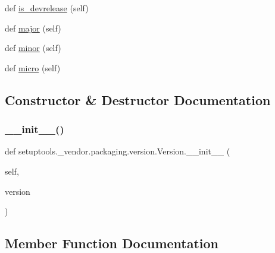 \begin{DoxyCompactItemize}
\item 
def \hyperlink{classsetuptools_1_1__vendor_1_1packaging_1_1version_1_1Version_a8b32bc8a3e8637e0c89748dbf16e2fe0}{is\+\_\+devrelease} (self)
\item 
def \hyperlink{classsetuptools_1_1__vendor_1_1packaging_1_1version_1_1Version_a790c4444a07565075020e9f3683d464d}{major} (self)
\item 
def \hyperlink{classsetuptools_1_1__vendor_1_1packaging_1_1version_1_1Version_a921ad0cf92cd8d0a63b75ae45d0c5cd7}{minor} (self)
\item 
def \hyperlink{classsetuptools_1_1__vendor_1_1packaging_1_1version_1_1Version_abce3f33f0ed231c5909acb2e64160e44}{micro} (self)
\end{DoxyCompactItemize}


\subsection{Constructor \& Destructor Documentation}
\mbox{\label{classsetuptools_1_1__vendor_1_1packaging_1_1version_1_1Version_ae8b2f8a830a6cf19c684030ff92c4671}} 
\subsubsection{\texorpdfstring{\+\_\+\+\_\+init\+\_\+\+\_\+()}{\_\_init\_\_()}}
{\footnotesize\ttfamily def setuptools.\+\_\+vendor.\+packaging.\+version.\+Version.\+\_\+\+\_\+init\+\_\+\+\_\+ (\begin{DoxyParamCaption}\item[{}]{self,  }\item[{}]{version }\end{DoxyParamCaption})}



\subsection{Member Function Documentation}
\mbox{\label{classsetuptools_1_1__vendor_1_1packaging_1_1version_1_1Version_a0d9472677e5b73b6603a86adee3b0eec}} 
